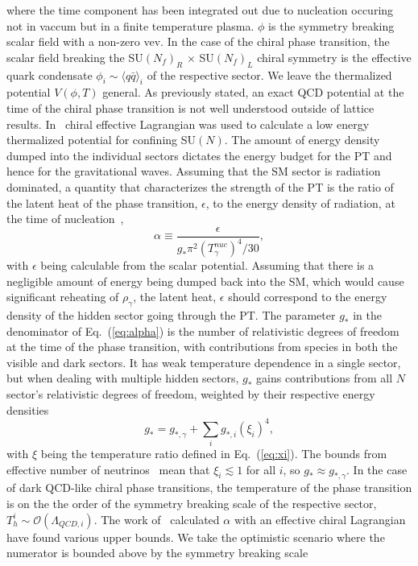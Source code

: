 \documentclass[nofootinbib,twocolumn,preprintnumbers]{revtex4-1}
\begin{document}
where the time component has been integrated out due to nucleation occuring not in vaccum but in a finite temperature plasma. $\phi$ is the symmetry breaking scalar field with a non-zero vev. In the case of the chiral phase transition, the scalar field breaking the SU$(N_f)_{R}$ $ \times$ SU$(N_f)_{L}$ chiral symmetry is the effective quark condensate $\phi_{i} \sim \langle q\bar{q} \rangle_{i}$ of the respective sector. We leave the thermalized potential $V(\phi, T)$ general. As previously stated, an exact QCD potential at the time of the chiral phase transition is not well understood outside of lattice results. In~\cite{Bai:2018dxf} chiral effective Lagrangian was used to calculate a low energy thermalized potential for confining SU$(N)$. 
The amount of energy density dumped into the individual sectors dictates the energy budget for the PT and hence for the gravitational waves. Assuming that the SM sector is radiation dominated, a quantity that characterizes the strength of the PT is the ratio of the latent heat of the phase transition, $\epsilon$, to the energy density of radiation, at the time of nucleation~\citep{Espinosa:2010hh},
\begin{equation}
\alpha     \equiv  \frac{\epsilon}{g_{*} \pi^2 (T^{nuc}_{\gamma})^4/30},
\label{eq:alpha}
\end{equation}
with $\epsilon$ being calculable from the scalar potential. Assuming that there is a negligible amount of energy being dumped back into the SM, which would cause significant reheating of $\rho_{\gamma}$,  the latent heat, $\epsilon$ should correspond to the energy density of the hidden sector going through the PT. The parameter $g_{*}$ in the denominator of Eq.~(\ref{eq:alpha}) is the number of relativistic degrees of freedom at the time of the phase transition, with contributions from species in both the visible and dark sectors. It has weak temperature dependence in a single sector, but when dealing with multiple hidden sectors, $g_{*}$ gains contributions from all $N$ sector's relativistic degrees of freedom, weighted by their respective energy densities
\begin{equation}\label{eqn:RelaDOF}
g_{*} = g_{*,\gamma} + \sum_{i} g_{*,i} (\xi_{i})^4,
\end{equation}
with $\xi$ being the temperature ratio defined in Eq.~(\ref{eq:xi}). The bounds from effective number of neutrinos~\citep{Aghanim:2018eyx} mean that $\xi_i \lesssim 1$ for all $i$, so $g_{*} \approx g_{*,\gamma}$. In the case of dark QCD-like chiral  phase transitions, the temperature of the phase transition is on the the order of the symmetry breaking scale of the respective sector, $T_{h}^{i} \sim \mathcal{O}(\Lambda_{QCD,i})$. The work of~\citep{Bai:2018dxf} calculated $\alpha$ with an effective chiral Lagrangian have found various upper bounds. We take the optimistic scenario where the numerator is bounded above by the symmetry breaking scale
\end{document}
